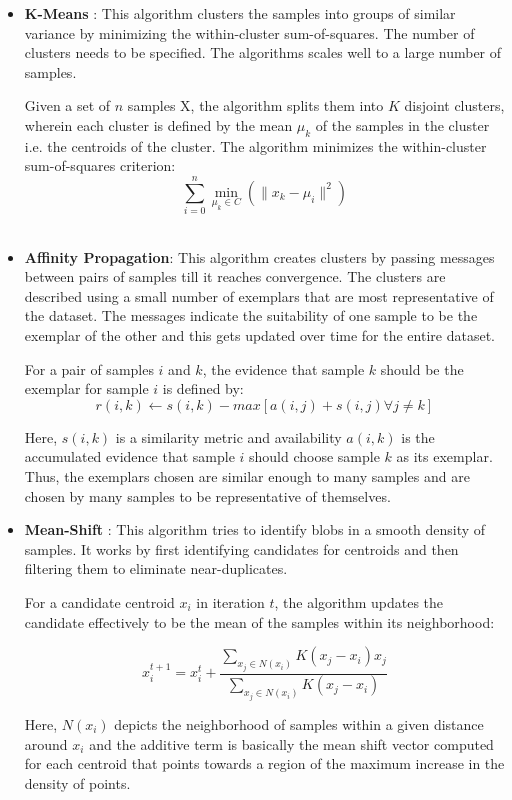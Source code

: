 \begin{itemize}
\item \textbf{K-Means} :
This algorithm clusters the samples into groups of similar variance by
minimizing the within-cluster sum-of-squares. The number of clusters
needs to be specified. The algorithms scales well to a large number of
samples.

Given a set of $n$ samples X, the algorithm splits them into $K$ disjoint
clusters, wherein each cluster is defined by the mean $\mu_k$ of the samples in
the cluster i.e. the centroids of the cluster.
The algorithm minimizes the within-cluster sum-of-squares criterion:
$$\sum_{i=0}^{n}\min_{\mu_{k} \in C}(\| x_{k} - \mu_{i} \|^2)$$\\

\item \textbf{Affinity Propagation}:
This algorithm creates clusters by passing messages between pairs of samples
till it reaches convergence. The clusters are described using a small number of
exemplars that are most representative of the dataset.
The messages indicate the suitability of one sample to be the exemplar of the
other and this gets updated over time for the entire dataset.

For a pair of samples $i$ and $k$, the evidence that sample $k$ should be the
exemplar for sample $i$ is defined by:
$$r(i,k) \leftarrow s(i,k) - max [a(i,j) + s(i,j) \forall j\neq k ]$$

Here, $s(i, k)$ is a similarity metric and availability $a(i, k)$ is the
accumulated evidence that sample $i$ should choose sample $k$ as its exemplar.
Thus, the exemplars chosen are similar enough to many samples and are
chosen by many samples to be representative of themselves.\\

\item \textbf{Mean-Shift} :
This algorithm tries to identify blobs in a smooth density of samples. 
It works by first identifying candidates for centroids and then filtering them
to eliminate near-duplicates.

For a candidate centroid $x_i$ in iteration $t$, the algorithm updates
the candidate effectively to be the mean of the samples within its neighborhood:

$$x_{i}^{t+1} = x_{i}^{t} + \frac{\sum_{x_{j} \in N(x_i)}K(x_{j} -
x_{i})x_{j}}{\sum_{x_{j} \in N(x_{i})}K(x_{j} - x_{i})} $$

Here, $N(x_i)$ depicts the neighborhood of samples within a given distance
around $x_i$ and the additive term is basically the mean shift vector 
computed for each centroid that points towards a region of the maximum
increase in the density of points.\\


\end{itemize}
